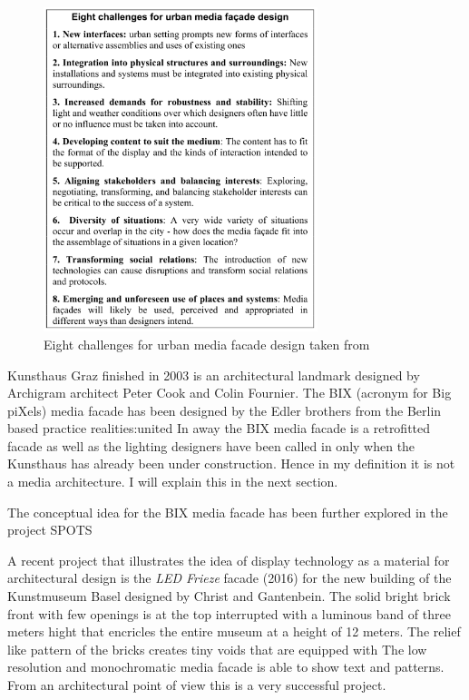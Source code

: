 \begin{figure}[htp]
\centering
\includegraphics[width=8cm]{Illustrations/8challenges.png}
\caption[Eight challenges for urban media facade design]{Eight challenges for urban media facade design taken from }
\label{8challenges}
\end{figure}


Kunsthaus Graz finished in 2003 is an architectural landmark designed by Archigram architect Peter Cook and Colin Fournier. 
The BIX {(acronym for Big piXels)} media facade has been designed by the Edler brothers from the Berlin based practice realities:united 
In away the BIX media facade is a retrofitted facade as well as the lighting designers have been called in only when the Kunsthaus has already been under construction. Hence in my definition it is not a media architecture. I will explain this in the next section.

The conceptual idea for the BIX media facade has been further explored in the project SPOTS 

A recent project that illustrates the idea of display technology as a material for architectural design is the \textit{LED Frieze} facade (2016)  for the new building of the Kunstmuseum Basel designed by Christ and Gantenbein. The solid bright brick front with few openings is at the top interrupted with a luminous band of three meters hight that encricles the entire museum at a height of 12 meters. The relief like pattern of the bricks creates tiny voids that are equipped with 
The low resolution and monochromatic media facade is able to show text and patterns. From an architectural point of view this is a very successful project.

